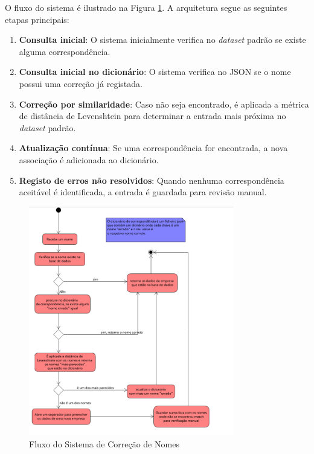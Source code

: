 \documentclass[a4paper,12pt]{article}
\begin{document}
O fluxo do sistema é ilustrado na Figura \ref{fig:design}. A arquitetura segue as seguintes etapas principais:
\begin{enumerate}
    \item \textbf{Consulta inicial}: O sistema inicialmente verifica no \textit{dataset} padrão se existe alguma correspondência.
    \item \textbf{Consulta inicial no dicionário}: O sistema verifica no JSON se o nome possui uma correção já registada.
    \item \textbf{Correção por similaridade}: Caso não seja encontrado, é aplicada a métrica de distância de Levenshtein para determinar a entrada mais próxima no \textit{dataset} padrão.
    \item \textbf{Atualização contínua}: Se uma correspondência for encontrada, a nova associação é adicionada ao dicionário.
    \item \textbf{Registo de erros não resolvidos}: Quando nenhuma correspondência aceitável é identificada, a entrada é guardada para revisão manual.
\end{enumerate}

\newpage

\begin{figure}[h!]
    \centering
    \includegraphics[width=0.8\textwidth]{images/system_design.png}
    \caption{Fluxo do Sistema de Correção de Nomes}
    \label{fig:design}
\end{figure}
\end{document}
